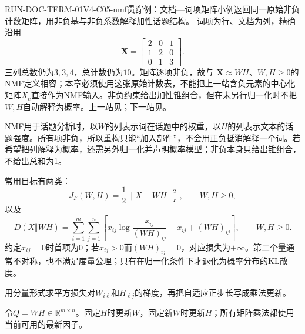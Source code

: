 \begin{SLRunningExample}{RUN-DOC-TERM-01}{V4-C05-nmf}{贯穿例：文档—词项矩阵小例}{返回同一原始非负计数矩阵，用非负基与非负系数解释加性话题结构。}
词项为行、文档为列，精确沿用
\[
\boldsymbol X=\begin{bmatrix}2&0&1\\1&2&0\\0&1&3\end{bmatrix}.
\]
三列总数仍为$3,3,4$，总计数仍为$10$。矩阵逐项非负，故与
$\boldsymbol X\approx WH$、$W,H\geq0$的NMF定义相容；本章必须使用这张原始计数表，不能把上一站含负元素的中心化矩阵$X_c$直接作为NMF输入。非负约束给出加性锥组合，但在未另行归一化时不把$W,H$自动解释为概率。上一站见；下一站见。
\end{SLRunningExample}

NMF用于话题分析时，以$W$的列表示词在话题中的权重，以$H$的列表示文本的话题强度。所有项非负，所以重构只能“加入部件”，不会用正负抵消解释一个词。若希望把列解释为概率，还需另外归一化并声明概率模型；非负本身只给出锥组合，不给出总和为1。

常用目标有两类：
\[
J_F(W,H)=\frac12\|X-WH\|_F^2,
\qquad W,H\ge0,
\]
以及
\[
D(X\Vert WH)=\sum_{i=1}^m\sum_{j=1}^n
\left[x_{ij}\log\frac{x_{ij}}{(WH)_{ij}}-x_{ij}+(WH)_{ij}\right],
\qquad W,H\ge0.
\]
约定$x_{ij}=0$时首项为0；若$x_{ij}>0$而$(WH)_{ij}=0$，对应损失为$+\infty$。第二个量通常不对称，也不满足度量公理；只有在归一化条件下才退化为概率分布的KL散度。


\begin{derivationgoalbox}
用分量形式求平方损失对$W_{i\ell}$和$H_{\ell j}$的梯度，再把自适应正步长写成乘法更新。
\end{derivationgoalbox}
\begin{derivationprepbox}
令$Q=WH\in\mathbb R^{m\times n}$。固定$H$时更新$W$，固定新$W$时更新$H$；所有矩阵乘法都使用当前可用的最新因子。
\end{derivationprepbox}

